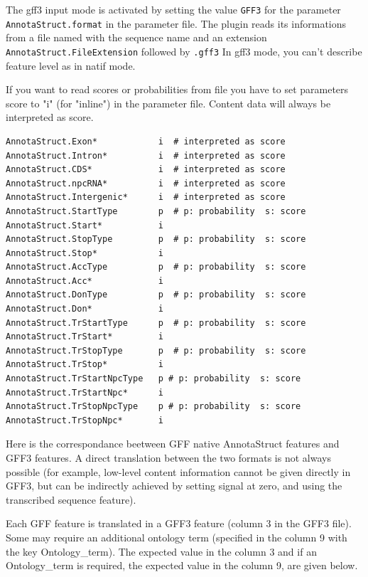 The gff3 input mode is activated by setting the value \texttt{GFF3}
for the parameter \texttt{AnnotaStruct.format} in the parameter file.
The plugin reads its informations from a file named with the sequence
name and an extension \texttt{AnnotaStruct.FileExtension} followed by
\texttt{.gff3} In gff3 mode, you can't describe feature level as in
natif mode.

If you want to read scores or probabilities from file you have to set
parameters score to "i" (for "inline") in the parameter file. Content data will
always be interpreted as score.
\begin{Verbatim}[fontsize=\small]
AnnotaStruct.Exon*            i  # interpreted as score
AnnotaStruct.Intron*          i  # interpreted as score
AnnotaStruct.CDS*             i  # interpreted as score
AnnotaStruct.npcRNA*          i  # interpreted as score
AnnotaStruct.Intergenic*      i	 # interpreted as score
AnnotaStruct.StartType        p  # p: probability  s: score 
AnnotaStruct.Start*           i
AnnotaStruct.StopType         p  # p: probability  s: score 
AnnotaStruct.Stop*            i
AnnotaStruct.AccType          p  # p: probability  s: score 
AnnotaStruct.Acc*             i
AnnotaStruct.DonType          p  # p: probability  s: score 
AnnotaStruct.Don*             i
AnnotaStruct.TrStartType      p  # p: probability  s: score 
AnnotaStruct.TrStart*         i
AnnotaStruct.TrStopType       p  # p: probability  s: score 
AnnotaStruct.TrStop*          i
AnnotaStruct.TrStartNpcType   p # p: probability  s: score 
AnnotaStruct.TrStartNpc*      i
AnnotaStruct.TrStopNpcType    p # p: probability  s: score   
AnnotaStruct.TrStopNpc*       i
\end{Verbatim}

Here is the correspondance beetween GFF native AnnotaStruct features
and GFF3 features. A direct translation between the two formats is not
always possible (for example, low-level content information cannot be
given directly in GFF3, but can be indirectly achieved by setting
signal at zero, and using the transcribed sequence feature).

Each GFF feature is translated in a GFF3 feature (column 3 in the GFF3 file). 
Some may require an additional ontology term (specified in the column 9 with the key Ontology\_term). 
The expected value in the column 3 and if an Ontology\_term is required, the expected value in the column 9, are given below.

